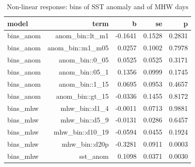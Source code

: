 \begin{table}[htbp]
\centering
\caption{Non-linear response: bins of SST anomaly and of MHW days}
\label{tab:nonlin}
\begin{tabular}{lrrrr}
\hline
model & term & b & se & p
\\ \hline
bins\_anom & anom\_bin::lt\_m1 & -0.1641 & 0.1528 & 0.2831 \\
bins\_anom & anom\_bin::m1\_m05 &  0.0257 & 0.1002 & 0.7978 \\
bins\_anom & anom\_bin::0\_05 &  0.0525 & 0.0525 & 0.3171 \\
bins\_anom & anom\_bin::05\_1 &  0.1356 & 0.0999 & 0.1745 \\
bins\_anom & anom\_bin::1\_15 &  0.0695 & 0.0953 & 0.4657 \\
bins\_anom & anom\_bin::gt\_15 & -0.0336 & 0.1455 & 0.8172 \\
bins\_mhw & mhw\_bin::d1\_4 & -0.0011 & 0.0713 & 0.9881 \\
bins\_mhw & mhw\_bin::d5\_9 & -0.0131 & 0.0286 & 0.6457 \\
bins\_mhw & mhw\_bin::d10\_19 & -0.0594 & 0.0455 & 0.1924 \\
bins\_mhw & mhw\_bin::d20p & -0.3281 & 0.0911 & 0.0003 \\
bins\_mhw & sst\_anom &  0.1098 & 0.0371 & 0.0030 \\
\hline
\end{tabular}
\end{table}

